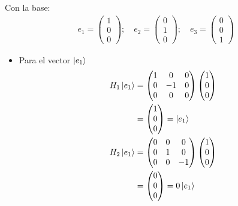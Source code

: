 \documentclass[12pt]{amsart}
\begin{document}
Con la base:
\begin{align*}
  e_1 =
  \begin{pmatrix}
    1 \\ 0 \\ 0
  \end{pmatrix}; \quad
  e_2 =
  \begin{pmatrix}
    0 \\ 1 \\ 0
  \end{pmatrix}; \quad
  e_3 =
  \begin{pmatrix}
    0 \\ 0 \\ 1
  \end{pmatrix}
\end{align*}

\begin{itemize}
  \item Para el vector $\ket{e_1}$
    \begin{align*}
      H_1 \ket{e_1} &=
      \begin{pmatrix}
        1 &  0 & 0 \\
        0 & -1 & 0 \\
        0 &  0 & 0
      \end{pmatrix} 
      \begin{pmatrix}
        1 \\ 0 \\ 0
      \end{pmatrix}\\
      &= \begin{pmatrix}
        1 \\ 0 \\ 0
      \end{pmatrix} = \ket{e_1}\\
      H_2 \ket{e_1} &=
      \begin{pmatrix}
        0 &  0 & 0 \\
        0 &  1 & 0 \\
        0 &  0 & -1
      \end{pmatrix} 
      \begin{pmatrix}
        1 \\ 0 \\ 0
      \end{pmatrix}\\
      &= \begin{pmatrix}
        0 \\ 0 \\ 0
      \end{pmatrix} = 0\ket{e_1}\\
    \end{align*}


\end{itemize}
\end{document}
